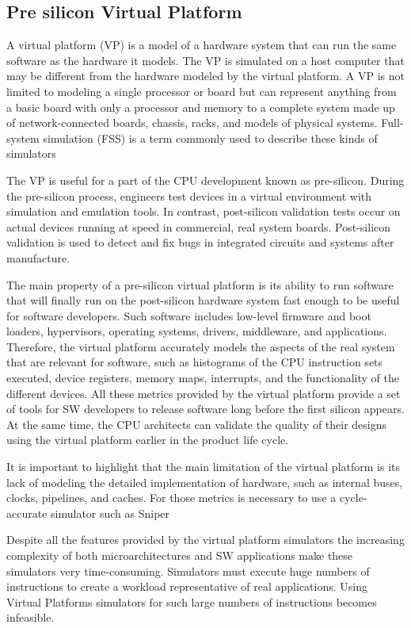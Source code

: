 \documentclass[]{PhDEngScITESO-R}
\begin{document}
\subsection{Pre silicon Virtual Platform }

A virtual platform (VP) is a model of a hardware system that can run the same software as the hardware it models. The VP is simulated on a host computer that may be different from the hardware modeled by the virtual platform. A VP is not limited to modeling a single processor or board but can represent anything from a basic board with only a processor and memory to a complete system made up of network-connected boards, chassis, racks, and models of physical systems. Full-system simulation (FSS) is a term commonly used to describe these kinds of simulators \cite{Aarno} \cite{Yang}

The VP is useful for a part of the CPU development known as pre-silicon. During the pre-silicon process, engineers test devices in a virtual environment with simulation and emulation tools. In contrast, post-silicon validation tests occur on actual devices running at speed in commercial, real system boards. Post-silicon validation is used to detect and fix bugs in integrated circuits and systems after manufacture.

The main property of a pre-silicon virtual platform is its ability to run  software that will finally run on the post-silicon hardware system fast enough to be useful for software developers. Such software includes low-level firmware and boot loaders, hypervisors, operating systems, drivers, middleware, and applications. Therefore, the virtual platform accurately models the aspects of the real system that are relevant for software, such as histograms of the CPU instruction sets executed, device registers, memory maps, interrupts, and the functionality of the different devices. All these metrics provided by the virtual platform provide a set of tools for SW developers to release software long before the first silicon appears. At the same time, the CPU architects can validate the quality of their designs using the virtual platform earlier in the product life cycle.

It is important to highlight that the main limitation of the virtual platform is its lack of  modeling the detailed implementation of  hardware, such as internal buses, clocks, pipelines, and caches. For those metrics is necessary to use a cycle-accurate simulator such as Sniper \cite{sniper}

Despite all the features provided by the virtual platform simulators the increasing complexity of both microarchitectures and SW applications make these simulators very time-consuming. Simulators must execute huge numbers of instructions to create a workload representative of real applications. Using Virtual Platforms simulators for such large numbers of instructions becomes infeasible. 
\end{document}
